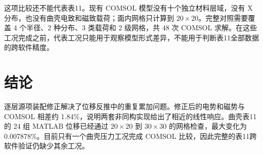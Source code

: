 \documentclass[UTF8,fontset=windows,11pt,a4paper]{ctexart}
\begin{document}
这项比较还不能代表表11。现有 COMSOL 模型没有十个独立材料层域，没有 X 分布，也没有曲壳电致和磁致载荷；面内网格只计算到 $20\times20$。完整对照需要覆盖 4 个半径、2 种分布、3 类载荷和 2 级网格，共 48 次 COMSOL 求解。在这些工况完成之前，代表工况只能用于观察模型形式差异，不能用于判断表11全部数据的跨软件精度。

\section{结论}

逐层源项装配修正解决了位移反推中的重复累加问题。修正后的电势和磁势与 COMSOL 相差约 1.84\%，说明两套非同构实现给出了相近的线性响应。曲壳表11的 24 组 MATLAB 位移已经通过 $20\times20$ 到 $30\times30$ 的网格检查，最大变化为 0.007878\%。目前只有一个曲壳压力工况完成 COMSOL 比较，因此完整的表11跨软件验证仍缺少其余工况。
\end{document}
